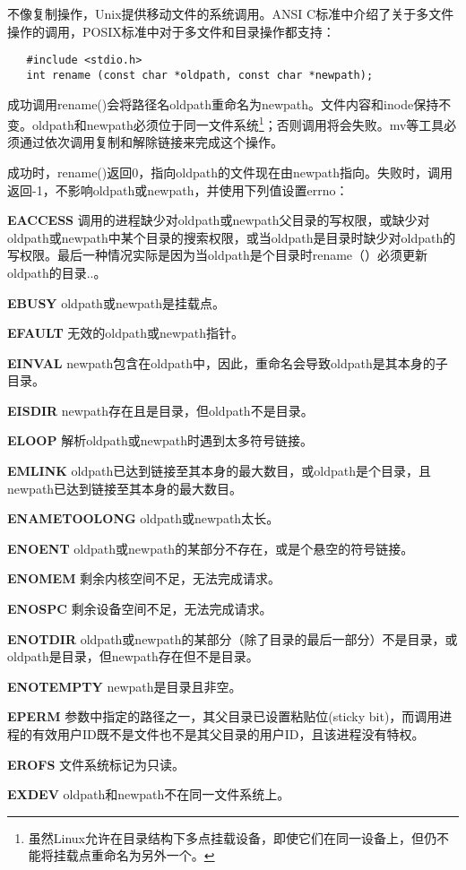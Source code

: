 不像复制操作，Unix提供移动文件的系统调用。ANSI C标准中介绍了关于多文件操作的调用，POSIX标准中对于多文件和目录操作都支持：

\begin{lstlisting}
   #include <stdio.h>
   int rename (const char *oldpath, const char *newpath);
\end{lstlisting}

成功调用rename()会将路径名oldpath重命名为newpath。文件内容和inode保持不变。oldpath和newpath必须位于同一文件系统\footnote[1]{虽然Linux允许在目录结构下多点挂载设备，即使它们在同一设备上，但仍不能将挂载点重命名为另外一个。}；否则调用将会失败。mv等工具必须通过依次调用复制和解除链接来完成这个操作。

成功时，rename()返回0，指向oldpath的文件现在由newpath指向。失败时，调用返回-1，不影响oldpath或newpath，并使用下列值设置errno：

\begin{eqlist*}
\item[\textbf{EACCESS}] 调用的进程缺少对oldpath或newpath父目录的写权限，或缺少对oldpath或newpath中某个目录的搜索权限，或当oldpath是目录时缺少对oldpath的写权限。最后一种情况实际是因为当oldpath是个目录时rename（）必须更新oldpath的目录..。
\item[\textbf{EBUSY}] oldpath或newpath是挂载点。
\item[\textbf{EFAULT}] 无效的oldpath或newpath指针。
\item[\textbf{EINVAL}] newpath包含在oldpath中，因此，重命名会导致oldpath是其本身的子目录。
\item[\textbf{EISDIR}] newpath存在且是目录，但oldpath不是目录。
\item[\textbf{ELOOP}] 解析oldpath或newpath时遇到太多符号链接。
\item[\textbf{EMLINK}] oldpath已达到链接至其本身的最大数目，或oldpath是个目录，且newpath已达到链接至其本身的最大数目。
\item[\textbf{ENAMETOOLONG}] oldpath或newpath太长。
\item[\textbf{ENOENT}] oldpath或newpath的某部分不存在，或是个悬空的符号链接。
\item[\textbf{ENOMEM}] 剩余内核空间不足，无法完成请求。
\item[\textbf{ENOSPC}] 剩余设备空间不足，无法完成请求。
\item[\textbf{ENOTDIR}] oldpath或newpath的某部分（除了目录的最后一部分）不是目录，或oldpath是目录，但newpath存在但不是目录。
\item[\textbf{ENOTEMPTY}] newpath是目录且非空。
\item[\textbf{EPERM}] 参数中指定的路径之一，其父目录已设置粘贴位(sticky bit)，而调用进程的有效用户ID既不是文件也不是其父目录的用户ID，且该进程没有特权。
\item[\textbf{EROFS}] 文件系统标记为只读。
\item[\textbf{EXDEV}] oldpath和newpath不在同一文件系统上。
\end{eqlist*}

